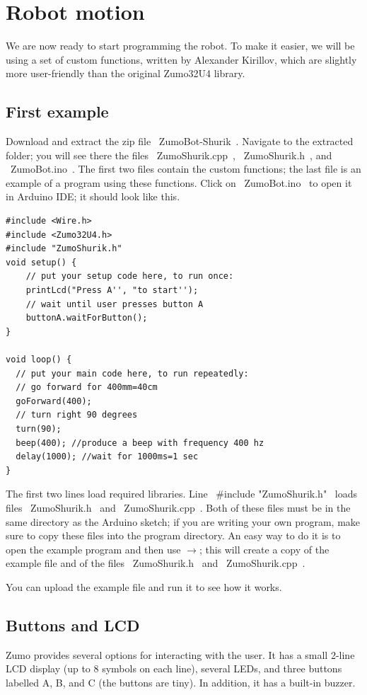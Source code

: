 \documentclass[oneside]{stml-l}
\numberwithin{figure}{chapter}
\newcommand{\menu}[1]{{\bf\sc{#1}}}
\newcommand{\smenu}[1]{$\to$\menu{#1}}
\begin{document}
\chapter{Robot motion}
We are now ready to start programming the robot. To make it easier, we
will be using a set of custom functions, written by Alexander Kirillov,
which are slightly more user-friendly than the original Zumo32U4 library.

\section{First example}
Download and extract the zip file ~ZumoBot-Shurik~. Navigate to the
extracted folder; you will see there the files ~ZumoShurik.cpp~, ~ZumoShurik.h~,
and ~ZumoBot.ino~. The first two files contain the custom functions;
the last file is an example of a program using these functions.
Click on  ~ZumoBot.ino~ to open it in Arduino IDE; it should look like this.

\begin{lstlisting}
#include <Wire.h>
#include <Zumo32U4.h>
#include "ZumoShurik.h"
void setup() {
    // put your setup code here, to run once:
    printLcd("Press A'', "to start'');
    // wait until user presses button A
    buttonA.waitForButton();
}

void loop() {
  // put your main code here, to run repeatedly:
  // go forward for 400mm=40cm
  goForward(400);
  // turn right 90 degrees
  turn(90);
  beep(400); //produce a beep with frequency 400 hz
  delay(1000); //wait for 1000ms=1 sec
}
\end{lstlisting}

The first two lines load required libraries. Line ~#include "ZumoShurik.h"~
loads files ~ZumoShurik.h~ and ~ZumoShurik.cpp~. Both of these files must
be in the same directory as the Arduino sketch; if you are writing your
own program, make sure to copy these files into the program directory.
An easy way to do it is to open the example program and then use
\menu{File}\smenu{Save As}; this will create a copy of the example file
and of the files ~ZumoShurik.h~ and ~ZumoShurik.cpp~.

You can upload the example file and run it to see how it works.

\section{Buttons and LCD}

Zumo provides several options for interacting with the user. It has a
small 2-line LCD display (up to 8 symbols on each line), several LEDs, and three
buttons labelled A, B, and C (the buttons are tiny). In addition, it has a built-in buzzer.
\end{document}
